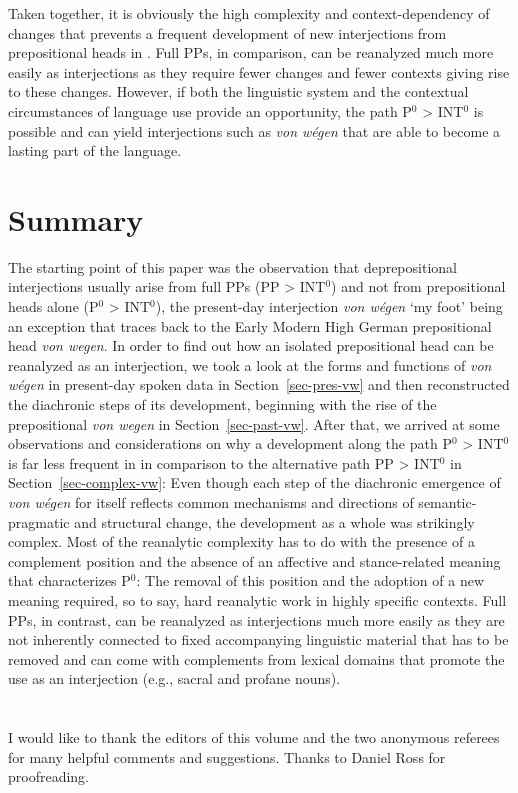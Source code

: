 \documentclass[output=paper
  ,nobabel
  ,draftmode
  ,babelshorthands
  ,colorlinks, citecolor=brown
]{langscibook}
\begin{document}
\largerpage
\noindent
Taken together, it is obviously the high complexity and context-dependency of changes that prevents a frequent development of new interjections from prepositional heads in . Full PPs, in comparison, can be reanalyzed much more easily as interjections as they require fewer changes and fewer contexts giving rise to these changes. However, if both the linguistic system and the contextual circumstances of language use provide an opportunity, the path P$^0$ > INT$^0$ is possible and can yield interjections such as \emph{von wégen} that are able to become a lasting part of the language.

\section{Summary}\label{sec-summ-büc}

The starting point of this paper was the observation that  deprepositional interjections usually arise from full PPs (PP > INT$^0$) and not from prepositional heads alone (P$^0$ > INT$^0$), the present-day  interjection \emph{von wégen} ‘my foot’ being an exception that traces back to the Early Modern High German prepositional head \emph{von wegen}. In order to find out how an isolated prepositional head can be reanalyzed as an interjection, we took a look at the forms and functions of \emph{von wégen} in present-day  spoken data in Section~\ref{sec-pres-vw} and then reconstructed the diachronic steps of its development, beginning with the rise of the prepositional \emph{von wegen} in Section~\ref{sec-past-vw}. After that, we arrived at some observations and considerations on why a development along the path P$^0$ > INT$^0$ is far less frequent in  in comparison to the alternative path PP > INT$^0$ in Section~\ref{sec-complex-vw}: Even though each step of the diachronic emergence of \emph{von wégen} for itself reflects common mechanisms and directions of semantic-pragmatic and structural change, the development as a whole was strikingly complex. Most of the reanalytic complexity has to do with the presence of a complement position and the absence of an affective and stance-related meaning that characterizes P$^0$: The removal of this position and the adoption of a new meaning required, so to say, hard reanalytic work in highly specific contexts. Full PPs, in contrast, can be reanalyzed as interjections much more easily as they are not inherently connected to fixed accompanying linguistic material that has to be removed and can come with complements from lexical domains that promote the use as an interjection (e.g., sacral and profane nouns).

\section*{\acknowledgmentsUS}
I would like to thank the editors of this volume and the two anonymous referees for many helpful comments and suggestions. Thanks to Daniel Ross for proofreading.

{\sloppy
\printbibliography[heading=subbibliography,notkeyword=this]
}
\end{document}
